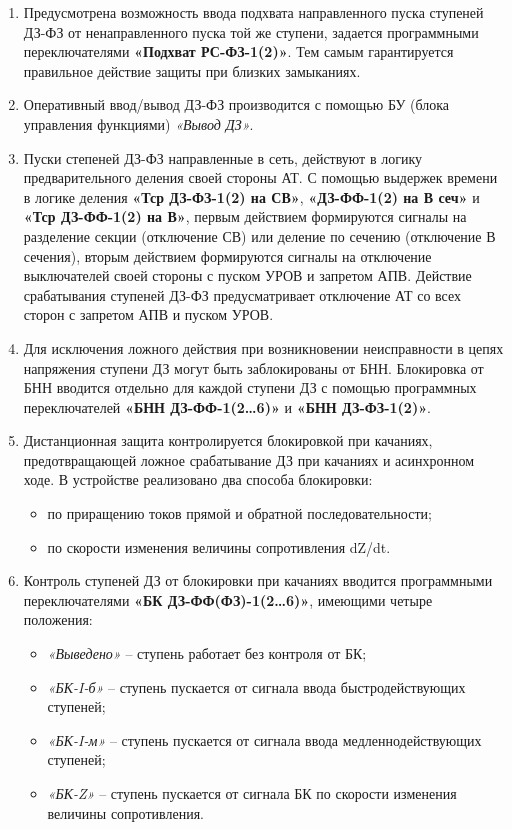\begin{enumerate}[label=\arabic{section}.\arabic{subsection}.\arabic{enumi}, labelsep=4pt, leftmargin=0pt, itemindent=57pt, itemsep=0pt, parsep=5pt]
\begin{enumerate}[label=\arabic{section}.\arabic{subsection}.\arabic{enumi}.\arabic*, labelsep=4pt, leftmargin=0em, itemindent=65pt, parsep=0pt]
\item
Предусмотрена возможность ввода подхвата направленного пуска ступеней ДЗ-ФЗ от ненаправленного
пуска той же ступени, задается программными переключателями \textbf{«Подхват РС-ФЗ-1(2)»}. Тем самым
гарантируется правильное действие защиты при близких замыканиях. 

\item
Оперативный ввод/вывод ДЗ-ФЗ производится с помощью БУ (блока управления функциями) \textit{«Вывод ДЗ»}.

\item
Пуски степеней ДЗ-ФЗ направленные в сеть, действуют в логику предварительного деления своей
стороны АТ. С помощью выдержек времени в логике деления \textbf{«Тср ДЗ-ФЗ-1(2) на СВ»}, \textbf{«ДЗ-ФФ-1(2) на В сеч»}
и \textbf{«Тср ДЗ-ФФ-1(2) на В»}, первым действием формируются сигналы на разделение секции (отключение СВ)
или деление по сечению (отключение В сечения), вторым действием формируются сигналы на отключение
выключателей своей стороны с пуском УРОВ и запретом АПВ. Действие срабатывания ступеней ДЗ-ФЗ
предусматривает отключение АТ со всех сторон с запретом АПВ и пуском УРОВ.

\item
Для исключения ложного действия при возникновении неисправности в цепях напряжения ступени ДЗ
могут быть заблокированы от БНН. Блокировка от БНН вводится отдельно для каждой ступени ДЗ с помощью
программных переключателей \textbf{«БНН ДЗ-ФФ-1(2…6)»} и \textbf{«БНН ДЗ-ФЗ-1(2)»}.

\item
Дистанционная защита контролируется блокировкой при качаниях, предотвращающей ложное
срабатывание ДЗ при качаниях и асинхронном ходе. В устройстве реализовано два способа блокировки:
\begin{itemize}
\item по приращению токов прямой и обратной последовательности;
\item по скорости изменения величины сопротивления dZ/dt.
\end{itemize}

\item
Контроль ступеней ДЗ от блокировки при качаниях вводится программными переключателями
\textbf{«БК ДЗ-ФФ(ФЗ)-1(2…6)»}, имеющими четыре положения:
\begin{itemize}
\item \textit{«Выведено»} -- ступень работает без контроля от БК;
\item \textit{«БК-I-б»} -- ступень пускается от сигнала ввода быстродействующих ступеней;
\item \textit{«БК-I-м»} -- ступень пускается от сигнала ввода медленнодействующих ступеней;
\item \textit{«БК-Z»} -- ступень пускается от сигнала БК по скорости изменения величины сопротивления.
\end{itemize}


\end{enumerate}
\end{enumerate}
